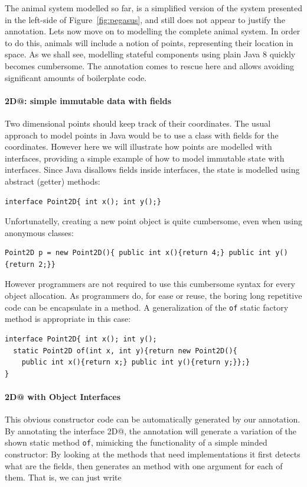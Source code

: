 The animal system modelled so far, is a simplified version of the
system presented in the left-side of Figure~\ref{fig:pegasus}, and still does not appear to 
justify the \mixin annotation. Lets now move on to modelling 
the complete animal system. In order to do this, animals will include 
a notion of points, representing their location in space. As we shall
see, modelling stateful components using plain Java 8 quickly becomes 
cumbersome. The \mixin annotation comes to rescue here and 
allows avoiding significant amounts of boilerplate code.

\paragraph{\Q@Point2D@: simple immutable data with fields}
Two dimensional points should keep track of their coordinates. 
The usual approach to model points in Java would be to use a class 
with fields for the coordinates. However here we will illustrate how 
points are modelled with interfaces, providing a simple 
example of how to model immutable state with interfaces. Since Java disallows fields 
inside interfaces, the state is modelled using abstract (getter) methods:

\begin{lstlisting}
interface Point2D{ int x(); int y();}
\end{lstlisting}

\noindent Unfortunatelly, creating a new point object is quite cumbersome, even 
when using anonymous classes: 

\begin{lstlisting}
Point2D p = new Point2D(){ public int x(){return 4;} public int y(){return 2;}}
\end{lstlisting}

\noindent However programmers are not required to use this cumbersome syntax for
every object allocation. As programmers do, for ease or reuse, the
boring long repetitive code can be encapsulate in a method. A
generalization of the \texttt{of} static factory
method is appropriate in this case:
\begin{lstlisting}
interface Point2D{ int x(); int y();
  static Point2D of(int x, int y){return new Point2D(){
    public int x(){return x;} public int y(){return y;}};}
}
\end{lstlisting}

\vspace{-5pt}
\paragraph{\Q@Point2D@ with Object Interfaces}
This obvious constructor code can be automatically generated by our
\mixin annotation.  By annotating the interface \Q@Point2D@, the
annotation will generate a variation of the shown static method
\texttt{of}, mimicking the functionality of a simple minded
constructor: By looking at the methods that need implementations it
first detects what are the fields, then generates an \Q@of@ method with
one argument for each of them. That is, we can just write

